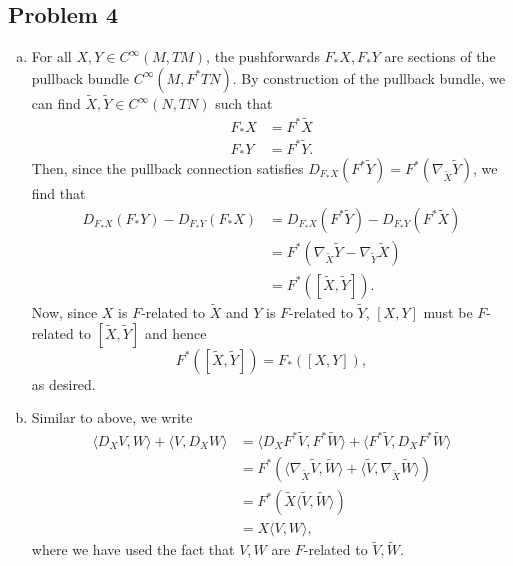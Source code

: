 \documentclass{../mathnotes}
\begin{document}
\subsection*{Problem 4}
\begin{enumerate}[(a)]
    \item For all $X,Y\in C^\infty(M,TM)$, the pushforwards $F_*X,F_*Y$ are sections of
        the pullback bundle $C^\infty(M,F^*TN)$. By construction of the pullback bundle,
        we can find $\tilde X,\tilde Y\in C^\infty(N,TN)$ such that
        \begin{align*}
            F_*X &= F^*\tilde X\\
            F_*Y &= F^*\tilde Y.
        \end{align*}
        Then, since the pullback connection satisfies $D_{F_*X}(F^*\tilde Y)=F^*(\nabla_{\tilde X}\tilde Y)$,
        we find that
        \begin{align*}
            D_{F_*X}(F_*Y)-D_{F_*Y}(F_*X) &= D_{F_*X}(F^*\tilde Y)-D_{F_*Y}(F^*\tilde X)\\
            &= F^*(\nabla_{\tilde X}\tilde Y-\nabla_{\tilde Y}\tilde X)\\
            &= F^*([\tilde X,\tilde Y]).
        \end{align*}
        Now, since $X$ is $F$-related to $\tilde X$ and $Y$ is $F$-related to $\tilde Y$,
        $[X,Y]$ must be $F$-related to $[\tilde X,\tilde Y]$ and hence
        \[F^*([\tilde X,\tilde Y])=F_*([X,Y]),\]
        as desired.
    \item Similar to above, we write
        \begin{align*}
            \langle D_XV,W\rangle + \langle V,D_XW\rangle &= \langle D_XF^*\tilde V,F^*\tilde W\rangle + \langle F^*\tilde V,D_XF^*\tilde W\rangle\\
            &= F^*\left(\langle \nabla_{\tilde X}\tilde V,\tilde W\rangle + \langle \tilde V, \nabla_{\tilde X}\tilde W\rangle\right)\\
            &= F^*\left( \tilde X\langle\tilde V,\tilde W\rangle \right)\\
            &= X\langle V, W\rangle,
        \end{align*}
        where we have used the fact that $V,W$ are $F$-related to $\tilde V,\tilde W$.
\end{enumerate}
\end{document}
